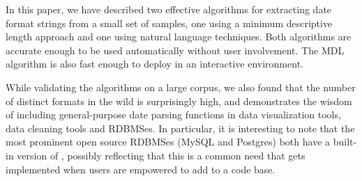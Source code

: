 In this paper, we have described two effective algorithms for extracting date format strings from a small set of samples, one using a minimum descriptive length approach and one using natural language techniques. Both algorithms are accurate enough to be used automatically without user involvement. The MDL algorithm is also fast enough to deploy in an interactive environment.

While validating the algorithms on a large corpus, we also found that the number of distinct formats in the wild is surprisingly high, and demonstrates the wisdom of including general-purpose date parsing functions in data visualization tools, data cleaning tools and RDBMSes. In particular, it is interesting to note that the most prominent open source RDBMSes (\eg MySQL and Postgres) both have a built-in version of \dateparse, possibly reflecting that this is a common need that gets implemented when users are empowered to add to a code base.
